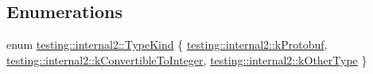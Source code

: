 \subsection*{Enumerations}
\begin{DoxyCompactItemize}
\item 
enum \hyperlink{namespacetesting_1_1internal2_aeb8161b0b3ee503347b0662d7028fd57}{testing\+::internal2\+::\+Type\+Kind} \{ \hyperlink{namespacetesting_1_1internal2_aeb8161b0b3ee503347b0662d7028fd57a14aaf98a2547ecf43eef0868d54b1383}{testing\+::internal2\+::k\+Protobuf}, 
\hyperlink{namespacetesting_1_1internal2_aeb8161b0b3ee503347b0662d7028fd57a9bdcf3f1548f498b2b7f097306ea0224}{testing\+::internal2\+::k\+Convertible\+To\+Integer}, 
\hyperlink{namespacetesting_1_1internal2_aeb8161b0b3ee503347b0662d7028fd57abe8aaea44751d6ebd0cdf5bd94451db1}{testing\+::internal2\+::k\+Other\+Type}
 \}
\end{DoxyCompactItemize}
